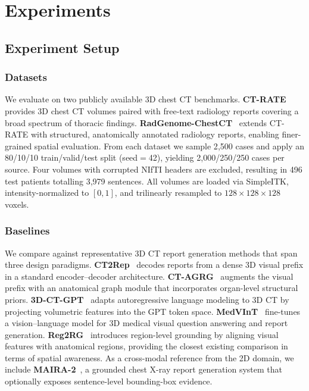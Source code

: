 \section{Experiments}
\label{sec:experiments}

\subsection{Experiment Setup}
\label{sec:experiment_setup}

\subsubsection{Datasets}
\label{sec:datasets}

We evaluate \method{} on two publicly available 3D chest CT benchmarks.
\textbf{CT-RATE}~\cite{hamamci2024ct2rep} provides 3D chest CT volumes paired with free-text radiology reports covering a broad spectrum of thoracic findings.
\textbf{RadGenome-ChestCT}~\cite{zhang2024radgenome} extends CT-RATE with structured, anatomically annotated radiology reports, enabling finer-grained spatial evaluation.
From each dataset we sample 2{,}500 cases and apply an 80/10/10 train/valid/test split (seed$=$42), yielding 2{,}000/250/250 cases per source.
Four volumes with corrupted NIfTI headers are excluded, resulting in 496 test patients totalling 3{,}979 sentences.
All volumes are loaded via SimpleITK, intensity-normalized to $[0,1]$, and trilinearly resampled to $128{\times}128{\times}128$ voxels.


\subsubsection{Baselines}
\label{sec:baselines}

We compare \method{} against representative 3D CT report generation methods that span three design paradigms.
\textbf{CT2Rep}~\cite{hamamci2024ct2rep} decodes reports from a dense 3D visual prefix in a standard encoder--decoder architecture.
\textbf{CT-AGRG}~\cite{dipiazza2024ctagrg} augments the visual prefix with an anatomical graph module that incorporates organ-level structural priors.
\textbf{3D-CT-GPT}~\cite{chen2024_3dctgpt} adapts autoregressive language modeling to 3D CT by projecting volumetric features into the GPT token space.
\textbf{MedVInT}~\cite{zhang2024medvint} fine-tunes a vision--language model for 3D medical visual question answering and report generation.
\textbf{Reg2RG}~\cite{chen2025reg2rg} introduces region-level grounding by aligning visual features with anatomical regions, providing the closest existing comparison in terms of spatial awareness.
As a cross-modal reference from the 2D domain, we include \textbf{MAIRA-2}~\cite{bannur2024maira2}, a grounded chest X-ray report generation system that optionally exposes sentence-level bounding-box evidence.

